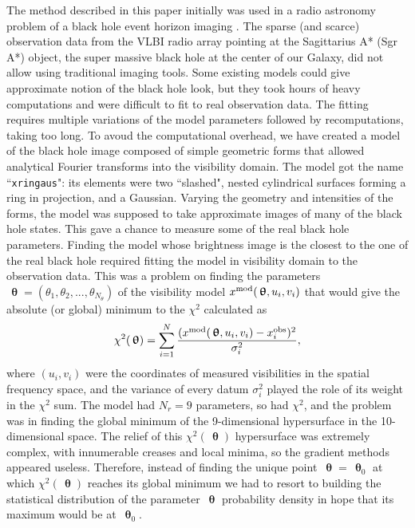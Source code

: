 \documentclass[preprint2]{aastex}
\newcommand{\bfth}{\,\bm{\uptheta}}
\begin{document}
The method described in this paper initially was used in a radio astronomy problem of a black hole event horizon imaging \citep{BenkevBHM}. The sparse (and scarce) observation data from the VLBI radio array pointing at the Sagittarius A* (Sgr A*) object, the super massive black hole at the center of our Galaxy, did not allow using traditional imaging tools. Some existing models could give approximate notion of the black hole look, but they took hours of heavy computations and were difficult to fit to real observation data. The fitting requires multiple variations of the model parameters followed by recomputations, taking too long. To avoud the computational overhead, we have created a model of the black hole image composed of simple geometric forms that allowed analytical Fourier transforms into the visibility domain. The model got the name ``\verb|xringaus|": its elements were two ``slashed", nested cylindrical surfaces forming a ring in projection, and a Gaussian. Varying the geometry and intensities of the forms, the model was supposed to take approximate images of many of the black hole states. This gave a chance to measure some of the real black hole parameters. Finding the model whose brightness image is the closest to the one of the real black hole required fitting the model in visibility domain to the observation data. This was a problem on finding the parameters $\bfth=(\theta_1,\theta_2,...,\theta_{N_\theta})$ of the visibility model $x^{\rm mod}(\bfth,u_i,v_i)$ that would give the absolute (or global) minimum to the $\chi^2$ calculated as
\begin{equation}
  \label{chi2}
  \chi^2(\bfth) = \sum_{i=1}^{N} \frac{(x^{\rm mod}(\bfth,u_i,v_i) - x_i^{\rm obs})^2}{\sigma_i^2},
\end{equation}
where $(u_i,v_i)$ were the coordinates of measured visibilities in the spatial frequency space, and the variance of every datum $\sigma_i^2$ played the role of its weight in the $\chi^2$ sum. The model had $N_r = 9$ parameters, so had $\chi^2$, and the problem was in finding the global minimum of the 9-dimensional hypersurface in the 10-dimensional space. The relief of this $\chi^2(\bfth)$ hypersurface was extremely complex, with innumerable creases and local minima, so the gradient methods appeared useless. Therefore, instead of finding the unique point $\bfth = \bfth_0$ at which $\chi^2(\bfth)$ reaches its global minimum we had to resort to building the statistical distribution of the parameter $\bfth$ probability density in hope that its maximum would be at $\bfth_0$. 
\end{document}
